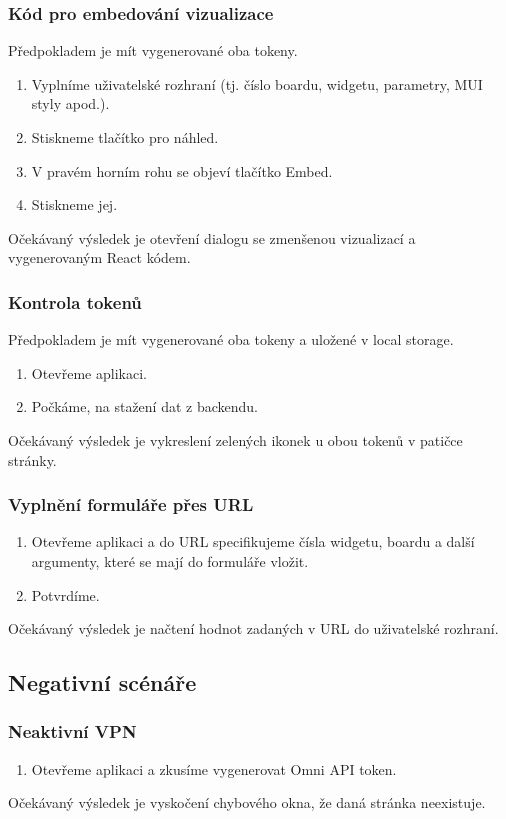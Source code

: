 \documentclass[czech, bc, kiv, he, iso690numb]{fasthesis}
\begin{document}
\subsubsection{Kód pro embedování vizualizace}
Předpokladem je mít vygenerované oba tokeny.
\begin{enumerate}
	\item Vyplníme uživatelské rozhraní (tj. číslo boardu, widgetu, parametry, MUI styly apod.).
	\item Stiskneme tlačítko pro náhled.
	\item V pravém horním rohu se objeví tlačítko Embed.
	\item Stiskneme jej.
\end{enumerate}
Očekávaný výsledek je otevření dialogu se zmenšenou vizualizací a vygenerovaným React kódem.

\subsubsection{Kontrola tokenů}
Předpokladem je mít vygenerované oba tokeny a uložené v local storage.

\begin{enumerate}
	\item Otevřeme aplikaci.
	\item Počkáme, na stažení dat z backendu.
\end{enumerate}
Očekávaný výsledek je vykreslení zelených ikonek u obou tokenů v patičce stránky.

\subsubsection{Vyplnění formuláře přes URL}

\begin{enumerate}
	\item Otevřeme aplikaci a do URL specifikujeme čísla widgetu, boardu a další argumenty, které se mají do formuláře vložit.
	\item Potvrdíme.
\end{enumerate}
Očekávaný výsledek je načtení hodnot zadaných v URL do uživatelské rozhraní.
\subsection{Negativní scénáře}

\subsubsection{Neaktivní VPN}
\begin{enumerate}
	\item Otevřeme aplikaci a zkusíme vygenerovat Omni API token.
\end{enumerate}
Očekávaný výsledek je vyskočení chybového okna, že daná stránka neexistuje.
\end{document}
